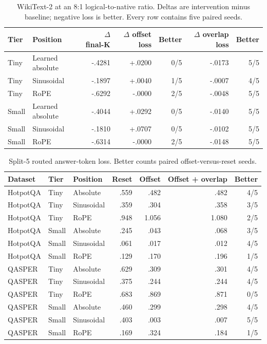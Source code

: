 \documentclass[11pt]{article}
\begin{document}
\begin{table}[H]
\centering
\scriptsize
\caption{WikiText-2 at an 8:1 logical-to-native ratio. Deltas are intervention minus
baseline; negative loss is better. Every row contains five paired seeds.}
\label{tab:wikitext-detail}
\begin{tabular}{llrrrrr}
\toprule
Tier & Position & $\Delta$ final-K & $\Delta$ offset loss & Better & $\Delta$ overlap loss & Better \\
\midrule
Tiny & Learned absolute & -.4281 & +.0200 & 0/5 & -.0173 & 5/5 \\
Tiny & Sinusoidal       & -.1897 & +.0040 & 1/5 & -.0007 & 4/5 \\
Tiny & RoPE             & -.6292 & -.0000 & 2/5 & -.0048 & 5/5 \\
Small & Learned absolute& -.4044 & +.0292 & 0/5 & -.0140 & 5/5 \\
Small & Sinusoidal      & -.1810 & +.0707 & 0/5 & -.0102 & 5/5 \\
Small & RoPE            & -.6314 & -.0000 & 2/5 & -.0148 & 5/5 \\
\bottomrule
\end{tabular}
\end{table}

\begin{table}[H]
\centering
\scriptsize
\caption{Split-5 routed answer-token loss. Better counts paired offset-versus-reset seeds.}
\label{tab:qa-detail}
\begin{tabular}{lllrrrr}
\toprule
Dataset & Tier & Position & Reset & Offset & Offset + overlap & Better \\
\midrule
HotpotQA & Tiny & Absolute & .559 & .482 & .482 & 4/5 \\
HotpotQA & Tiny & Sinusoidal & .359 & .304 & .358 & 3/5 \\
HotpotQA & Tiny & RoPE & .948 & 1.056 & 1.080 & 2/5 \\
HotpotQA & Small & Absolute & .245 & .043 & .068 & 3/5 \\
HotpotQA & Small & Sinusoidal & .061 & .017 & .012 & 4/5 \\
HotpotQA & Small & RoPE & .129 & .170 & .196 & 1/5 \\
QASPER & Tiny & Absolute & .629 & .309 & .301 & 4/5 \\
QASPER & Tiny & Sinusoidal & .375 & .244 & .244 & 4/5 \\
QASPER & Tiny & RoPE & .683 & .869 & .871 & 0/5 \\
QASPER & Small & Absolute & .460 & .299 & .298 & 4/5 \\
QASPER & Small & Sinusoidal & .403 & .003 & .007 & 5/5 \\
QASPER & Small & RoPE & .169 & .324 & .184 & 1/5 \\
\bottomrule
\end{tabular}
\end{table}
\end{document}
